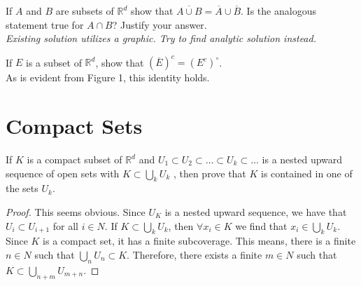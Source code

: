 \documentclass[12pt]{book}
\newcommand{\R}{\mathbb{R}}
\newenvironment{exercise}[2][Exercise]{\begin{trivlist}
\item[\hskip \labelsep {\bfseries #1}\hskip \labelsep {\bfseries #2.}]}{\end{trivlist}}
\begin{document}
\begin{exercise}{7.2.7}
\begin{exercise}{7.3.9}
If $A$ and $B$ are subsets of $\R^d$ show that $\overline{A \cup B} = \overline{A} \cup \overline{B}$. Is the analogous statement true for $A \cap B$? Justify your answer. \\


\emph{Existing solution utilizes a graphic. Try to find analytic solution instead.}
\end{exercise}


\begin{exercise}{7.3.15}
If $E$ is a subset of $\R^d$, show that $(\overline{E})^c = (E^c)^\circ$. \\

As is evident from Figure 1, this identity holds.
\end{exercise}



\section{Compact Sets}


\begin{exercise}{7.4.1}
If $K$ is a compact subset of $\R^d$ and $U_1 \subset U_2 \subset \hdots \subset U_k \subset \hdots$ is a
nested upward sequence of open sets with $K \subset \bigcup_k U_k$ , then prove that $K$ is contained in one of the sets $U_k$.



\begin{proof}
    This seems obvious. Since $U_K$ is a nested upward sequence, we have that $U_i \subset U_{i+1}$ for all $i\in N$. If $K \subset \bigcup_k U_k$, then $\forall x_i \in K$ we find that $x_i \in \bigcup_k U_k$. Since $K$ is a compact set, it has a finite subcoverage. This means, there is a finite $n \in N$ such that $\bigcup_n U_n \subset K$. Therefore, there exists a finite $m \in N$ such that $K \subset \bigcup_{n+m} U_{m+n}$.
\end{proof}
\end{exercise}





\end{exercise}
\end{document}
